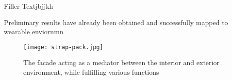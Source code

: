 
Filler Textjbjjkh

Preliminary results have already been obtained and successfully mapped to wearable enviornmn









\begin{figure}
\begin{center}
\texttt{[image: strap-pack.jpg]}
\caption{The facade acting as a mediator between the interior and exterior environment, while fulfilling various functions \cite{IPCC}}
\label{fig:ASFschematic}
\end{center}
\end{figure}





